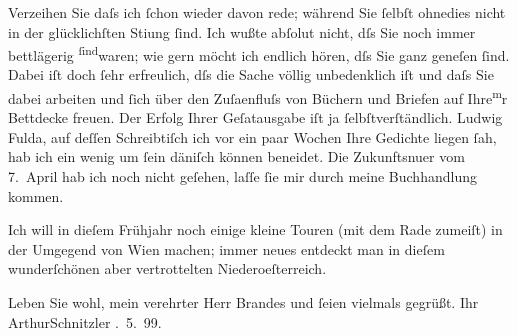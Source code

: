 \pstart
           Verzeihen Sie daſs ich ſchon wieder davon rede; während Sie ſelbſt ohnedies nicht in
               der glücklichſten Sti{\geminationm}ung ſind. Ich wußte abſolut nicht,
               dſs Sie noch immer bettläge{\pb}rig \substVorne{}\textsuperscript{ſind}\substDazwischen{}waren\substHinten{}; wie gern möcht ich endlich hören, dſs Sie ganz geneſen ſind. Dabei iſt doch
               ſehr erfreulich, dſs die Sache völlig unbedenklich iſt und daſs Sie dabei arbeiten
               und ſich über den Zuſa{\geminationm}enfluſs von Büchern und Briefen
               auf Ihre\substVorne{}\textsuperscript{m}\substDazwischen{}r\substHinten{} Bettdecke freuen. Der Erfolg Ihrer Geſa{\geminationm}tausgabe iſt ja
               ſelbſtverſtändlich. Ludwig Fulda, auf deſſen
               Schreibtiſch ich vor ein paar Wochen {\pb}Ihre Gedichte liegen ſah, hab ich
               ein wenig um ſein däniſch können beneidet. Die
                  Zukunftsnu{\geminationm}er vom
                  7. April hab ich noch nicht geſehen, laſſe ſie mir durch meine
               Buchhandlung kommen.\pend
           
\pstart
           Ich will in dieſem Frühjahr noch einige kleine Touren (mit dem Rade zumeiſt) in der
               Umgegend von Wien machen; immer neues entdeckt man
               in dieſem wunderſchönen aber vertrottelten Niederoeſterreich.\pend
           
\pstart
           {\pb}Leben Sie wohl, mein verehrter Herr Brandes und
               ſeien vielmals gegrüßt.\pend
           \pstart Ihr \spacefill\mbox{ArthurSchnitzler}\pend{}
. 5. 99.\pend
           \endnumbering{}  
      